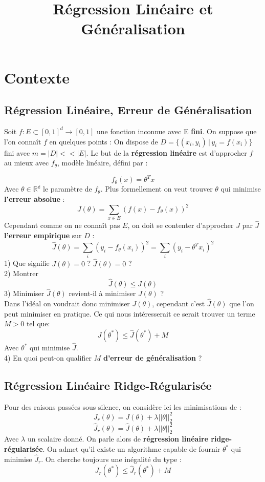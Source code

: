 \documentclass[12pt]{article}
\title{Régression Linéaire et Généralisation}
\begin{document}
\maketitle


\section{Contexte}
\subsection{Régression Linéaire, Erreur de Généralisation}
Soit $f: E \subset [0,1]^d \to [0,1]$ une fonction inconnue avec E \textbf{fini}.   
On suppose que l'on connaît $f$ en quelques points :     
On dispose de $D = \{(x_i,y_i) \, | \, y_i = f(x_i)\}$ fini avec $m = |D| << |E|$.   
Le but de la \textbf{régression linéaire} est d'approcher $f$ au mieux avec $f_\theta$, modèle linéaire, défini par :   

$$ f_\theta(x) = \theta^{T}x$$
Avec $\theta \in \mathbb{R^d}$ le paramètre de $f_\theta$.    
Plus formellement on veut trouver $\theta$ qui minimise \textbf{l'erreur absolue} :   
$$ J(\theta) = \sum_{x \in E} (f(x)-f_\theta(x))^2 $$    
Cependant comme on ne connaît pas $E$, on doit se contenter d'approcher $J$ par $\hat J$ \textbf{l'erreur empirique} sur $D$ :
$$ \hat{J}(\theta) =  \sum_{i} (y_i-f_\theta(x_i))^2 = \sum_{i} (y_i-\theta^{T}x_i)^2 $$ 
1) Que signifie $J(\theta) = 0$ ? $\hat{J}(\theta) = 0$ ?   \\
2) Montrer $$ \hat{J}(\theta) \leq J(\theta)$$     
3) Minimiser $\hat{J}(\theta)$ revient-il à minimiser $J(\theta)$ ?   \\
Dans l'idéal on voudrait donc minimiser $J(\theta)$, cependant c'est $\hat{J}(\theta)$ que l'on peut minimiser en pratique.   
Ce qui nous intéresserait ce serait trouver un terme $M > 0$ tel que:    
$$ J(\theta^*) \leq \hat{J}(\theta^*) + M$$   
Avec $\theta^*$ qui minimise $\hat{J}$.  \\  
4) En quoi peut-on qualifier $M$ \textbf{d'erreur de généralisation} ?
\subsection{Régression Linéaire Ridge-Régularisée}
Pour des raisons passées sous silence, on considère ici les minimisations de : 
$$ J_r(\theta) = J(\theta) + \lambda ||\theta||_2^2 $$
$$\hat{J}_r(\theta) = \hat{J}(\theta) + \lambda ||\theta||_2^2$$   
Avec $\lambda$ un scalaire donné.   
On parle alors de \textbf{régression linéaire ridge-régularisée}.  
On admet qu'il existe un algorithme capable de fournir $\theta^{*}$ qui minimise $\hat{J}_r $.   
On cherche toujours une inégalité du type :   
$$ J_r(\theta^{*}) \leq \hat{J}_r(\theta^{*}) + M$$   
\end{document}

